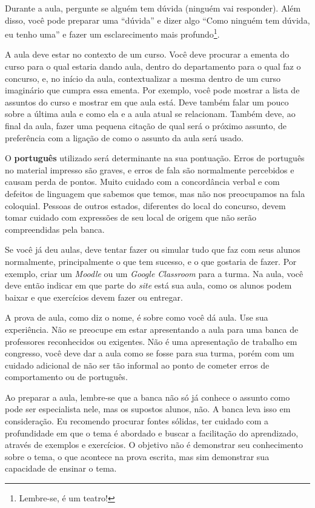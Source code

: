 \documentclass{article}
\begin{document}
Durante a aula, pergunte se alguém tem dúvida (ninguém vai responder). Além disso, você pode preparar uma ``dúvida'' e dizer algo ``Como ninguém tem dúvida, eu tenho uma'' e fazer um esclarecimento mais profundo\footnote{Lembre-se, é um teatro!}.


A aula deve estar no contexto de um curso. Você deve procurar a ementa do curso para o qual estaria dando aula, dentro do departamento para o qual faz o concurso, e, no início da aula, contextualizar a mesma dentro de um curso imaginário que cumpra essa ementa. Por exemplo, você pode mostrar a lista de assuntos do curso e mostrar em que aula está. Deve também falar um pouco sobre a última aula e como ela e a aula atual se relacionam. Também deve, ao final da aula, fazer uma pequena citação de qual será o próximo assunto, de preferência com a ligação de como o assunto da aula será usado.

O \textbf{português} utilizado será determinante na sua pontuação.
Erros de português no material impresso são graves, e erros de fala são normalmente percebidos e causam perda de pontos.
Muito cuidado com a concordância verbal e com defeitos de linguagem que sabemos que temos, mas não nos preocupamos na fala coloquial.
Pessoas de outros estados, diferentes do local do concurso, devem tomar cuidado com expressões de seu local de origem que não serão compreendidas pela banca.

Se você já deu aulas, deve tentar fazer ou simular tudo que faz com seus alunos normalmente, principalmente o que tem sucesso, e o que gostaria de fazer.
Por exemplo, criar um \textit{Moodle} ou um \textit{Google Classroom} para a turma.
Na aula, você deve então indicar em que parte do \textit{site} está sua aula, como os alunos podem baixar e que exercícios devem fazer ou entregar.

A prova de aula, como diz o nome, é sobre como você dá aula.
Use sua experiência. Não se preocupe em estar apresentando a aula para uma banca de professores reconhecidos ou exigentes.
Não é uma apresentação de trabalho em congresso, você deve dar a aula  como se fosse para sua turma, porém com um cuidado adicional de não ser tão informal ao ponto de cometer erros de comportamento ou de português.

Ao preparar a aula, lembre-se que a banca não só já conhece o assunto como pode ser especialista nele, mas os supostos alunos, não. A banca leva isso em consideração.
Eu recomendo procurar fontes sólidas, ter cuidado com a profundidade em que o tema é abordado e buscar a facilitação do aprendizado, através de exemplos e exercícios.
O objetivo não é demonstrar seu conhecimento sobre o tema, o que acontece na prova escrita, mas sim demonstrar sua capacidade de ensinar o tema.
\end{document}

